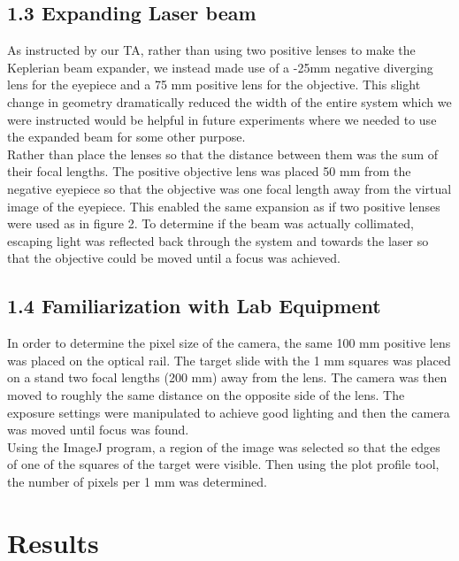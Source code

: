 \documentclass[letter, 11pt, onecolumn]{article}
\begin{document}
		\subsection*{1.3 Expanding Laser beam} 
		As instructed by our TA, rather than using two positive lenses to make the Keplerian beam expander, we instead made use of a -25mm negative diverging lens for the eyepiece and a 75 mm positive lens for the objective. This slight change in geometry dramatically reduced the width of the entire system which we were instructed would be helpful in future experiments where we needed to use the expanded beam for some other purpose. \\ 
		
		\noindent Rather than place the lenses so that the distance between them was the sum of their focal lengths. The positive objective lens was placed 50 mm from the negative eyepiece so that the objective was one focal length away from the virtual image of the eyepiece. This enabled the same expansion as if two positive lenses were used as in figure 2. To determine if the beam was actually collimated, escaping light was reflected back through the system and towards the laser so that the objective could be moved until a focus was achieved. 
		
		\subsection*{1.4 Familiarization with Lab Equipment} 
		In order to determine the pixel size of the camera, the same 100 mm positive lens was placed on the optical rail. The target slide with the 1 mm squares was placed on a stand two focal lengths (200 mm) away from the lens. The camera was then moved to roughly the same distance on the opposite side of the lens. The exposure settings were manipulated to achieve good lighting and then the camera was moved until focus was found. \\ 
		
		Using the ImageJ program, a region of the image was selected so that the edges of one of the squares of the target were visible. Then using the plot profile tool, the number of pixels per 1 mm was determined. 
		
	\section*{Results}
\end{document}
